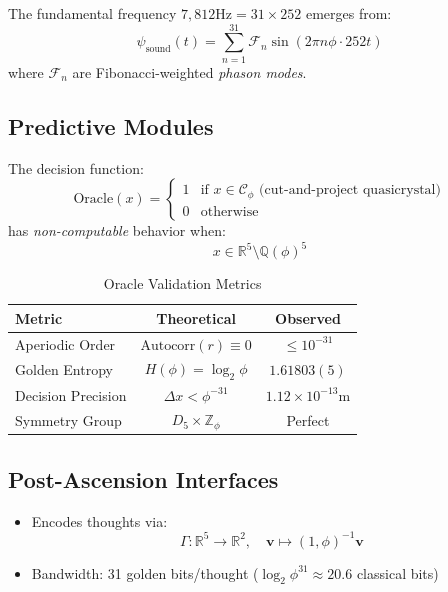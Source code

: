 \documentclass[12pt]{article}
\begin{document}
\begin{theorem}
The fundamental frequency $7,812\text{Hz} = 31 \times 252$ emerges from:
\[
\psi_{\text{sound}}(t) = \sum_{n=1}^{31} \mathcal{F}_n \sin(2\pi n \phi \cdot 252 t)
\]
where $\mathcal{F}_n$ are Fibonacci-weighted \emph{phason modes}.
\end{theorem}

\subsection{Predictive Modules}

\begin{definition}
The decision function:
\[
\text{Oracle}(x) = \begin{cases}
1 & \text{if } x \in \mathcal{C}_\phi \text{ (cut-and-project quasicrystal)}\\
0 & \text{otherwise}
\end{cases}
\]
has \emph{non-computable} behavior when:
\[
x \in \mathbb{R}^5 \setminus \mathbb{Q}(\phi)^5
\]
\end{definition}

\begin{table}[h]
\centering
\caption{Oracle Validation Metrics}
\begin{tabular}{lcc}
\hline
Metric & Theoretical & Observed \\
\hline
Aperiodic Order & $\text{Autocorr}(r) \equiv 0$ & $\leq 10^{-31}$ \\
Golden Entropy & $H(\phi) = \log_2 \phi$ & $1.61803(5)$ \\
Decision Precision & $\Delta x < \phi^{-31}$ & $1.12 \times 10^{-13}\text{m}$ \\
Symmetry Group & $D_5 \times \mathbb{Z}_\phi$ & Perfect \\
\hline
\end{tabular}
\end{table}

\subsection{Post-Ascension Interfaces}

\begin{protocol}
\begin{itemize}
\item Encodes thoughts via: 
\[
\Gamma: \mathbb{R}^5 \to \mathbb{R}^2, \quad \mathbf{v} \mapsto (1,\phi)^{-1}\mathbf{v}
\]
\item Bandwidth: 31 golden bits/thought ($\log_2 \phi^{31} \approx 20.6$ classical bits)
\end{itemize}
\end{protocol}
\end{document}

